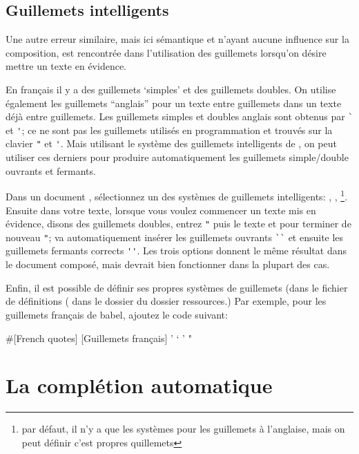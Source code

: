\subsection{Guillemets intelligents}

Une autre erreur similaire, mais ici sémantique et n'ayant aucune influence sur la composition, est rencontrée dans l'utilisation des guillemets lorsqu'on désire mettre un texte en évidence.

En français il y a des guillemets `simples' et des guillemets \og{}doubles\fg. On utilise également les guillemets ``anglais'' pour un texte entre guillemets dans un texte déjà entre guillemets. Les guillemets simples et doubles anglais sont obtenus par \verb|`| et \verb|'|; ce ne sont pas les guillemets utilisés en programmation et trouvés sur la clavier \verb|"| et \verb|'|. Mais utilisant le système des guillemets intelligents de \Tw, on peut utiliser ces derniers pour produire automatiquement les guillemets simple/double ouvrants et fermants.

Dans un document , sélectionnez un des systèmes de guillemets intelligents: \submenu{}\submenu{}, \submenu{}, \submenu{} \footnote{par défaut, il n'y a que les systèmes pour les guillemets à l'anglaise, mais on peut définir c'est propres quillemets}. Ensuite dans votre texte, lorsque vous voulez commencer un texte mis en évidence, disons des guillemets doubles, entrez \verb|"| puis le texte et pour terminer de nouveau \verb|"|; \Tw{} va automatiquement insérer les guillemets ouvrants \verb|``| et ensuite les guillemets fermants corrects \verb|''|. Les trois options donnent le même résultat dans le document composé, mais  devrait bien fonctionner dans la plupart des cas.

Enfin, il est possible de définir ses propres systèmes de guillemets (dans le fichier de définitions ( dans le dossier  du dossier ressources.) Par exemple, pour les guillemets français de babel, ajoutez le code suivant:
\begin{verbExample}
#[French quotes]
[Guillemets français]
'   `     '
"   \og{}    \fg{}
\end{verbExample}

\section{La complétion automatique}

